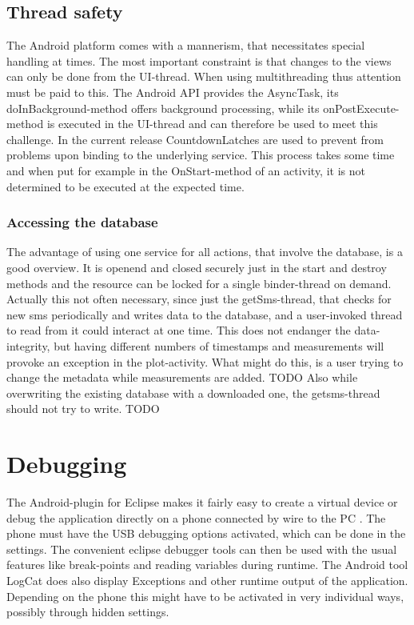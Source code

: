 \documentclass[11pt,oneside,a4paper]{scrartcl}
\begin{document}
\subsection{Thread safety}
The Android platform comes with a mannerism, that necessitates special handling at times. The most important constraint is that changes to the views can only be done from the UI-thread. When using multithreading thus attention must be paid to this. The Android API provides the AsyncTask, its doInBackground-method offers background processing, while its onPostExecute-method is executed in the UI-thread and can therefore be used to meet this challenge.
In the current release CountdownLatches are used to prevent from problems upon binding to the underlying service. This process takes some time and when put for example in the OnStart-method of an activity, it is not determined to be executed at the expected time.

\subsubsection{Accessing the database}\label{sec:database_safety}
The advantage of using one service for all actions, that involve the database, is a good overview. It is openend and closed securely just in the start and destroy methods and the resource can be locked for a single binder-thread on demand. Actually this not often necessary, since just the getSms-thread, that checks for new sms periodically and writes data to the database, and a user-invoked thread to read from it could interact at one time. This does not endanger the data-integrity, but having different numbers of timestamps and measurements will provoke an exception in the plot-activity.
What might do this, is a user trying to change the metadata while measurements are added. TODO
Also while overwriting the existing database with a downloaded one, the getsms-thread should not try to write. TODO
\section{Debugging}\label{sec:Debugging}
The Android-plugin for Eclipse makes it fairly easy to create a virtual device or debug the application directly on a phone connected by wire to the PC . The phone must have the USB debugging options activated, which can be done in the settings. The convenient eclipse debugger tools can then be used with the usual features like break-points and reading variables during runtime. The Android tool LogCat does also display Exceptions and other runtime output of the application. Depending on the phone this might have to be activated in very individual ways, possibly through hidden settings.
\end{document}
